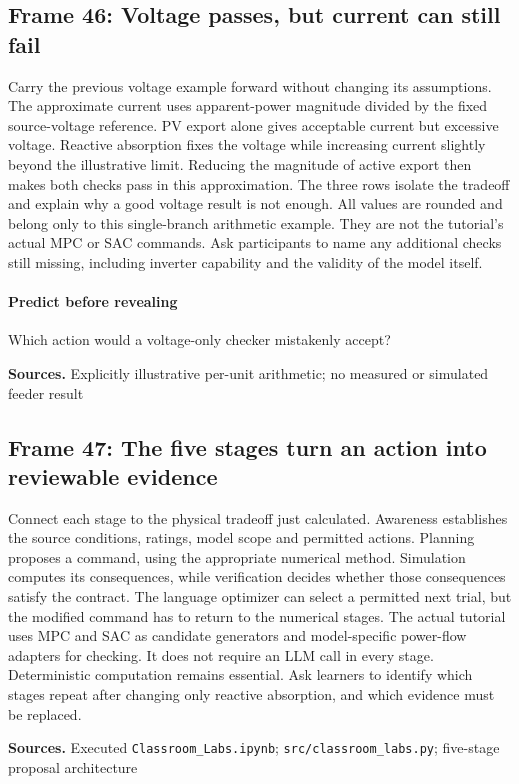 \documentclass[11pt]{article}
\begin{document}
\subsection*{Frame 46: Voltage passes, but current can still fail}
Carry the previous voltage example forward without changing its assumptions. The approximate current uses apparent-power magnitude divided by the fixed source-voltage reference. PV export alone gives acceptable current but excessive voltage. Reactive absorption fixes the voltage while increasing current slightly beyond the illustrative limit. Reducing the magnitude of active export then makes both checks pass in this approximation. The three rows isolate the tradeoff and explain why a good voltage result is not enough. All values are rounded and belong only to this single-branch arithmetic example. They are not the tutorial's actual MPC or SAC commands. Ask participants to name any additional checks still missing, including inverter capability and the validity of the model itself.\par
\paragraph{Predict before revealing}Which action would a voltage-only checker mistakenly accept?
\par\nopagebreak\begin{minipage}{\linewidth}{\footnotesize\color{slate}\textbf{Sources.} Explicitly illustrative per-unit arithmetic; no measured or simulated feeder result\par}\end{minipage}\par\medskip
\subsection*{Frame 47: The five stages turn an action into reviewable evidence}
Connect each stage to the physical tradeoff just calculated. Awareness establishes the source conditions, ratings, model scope and permitted actions. Planning proposes a command, using the appropriate numerical method. Simulation computes its consequences, while verification decides whether those consequences satisfy the contract. The language optimizer can select a permitted next trial, but the modified command has to return to the numerical stages. The actual tutorial uses MPC and SAC as candidate generators and model-specific power-flow adapters for checking. It does not require an LLM call in every stage. Deterministic computation remains essential. Ask learners to identify which stages repeat after changing only reactive absorption, and which evidence must be replaced.\par
\par\nopagebreak\begin{minipage}{\linewidth}{\footnotesize\color{slate}\textbf{Sources.} Executed \texttt{Classroom\_Labs.ipynb}; \texttt{src/classroom\_labs.py}; five-stage proposal architecture\par}\end{minipage}\par\medskip
\end{document}
